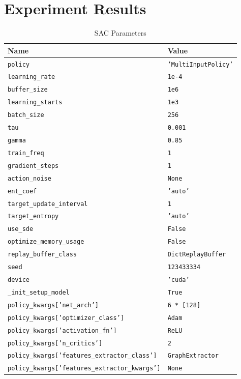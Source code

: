 \chapter{Experiment Results} \label{appendix2}


\begin{table}[H]
	\centering
	\caption{\ac{SAC} Parameters}
	\begin{tabular}{ll}
		\toprule
		\textbf{Name} & \textbf{Value} \\
		\midrule
		
		\texttt{policy} & \texttt{'MultiInputPolicy'} \\
		\texttt{learning\_rate} & \texttt{1e-4}\\
		\texttt{buffer\_size} & \texttt{1e6} \\
		\texttt{learning\_starts} & \texttt{1e3} \\
		\texttt{batch\_size} & \texttt{256} \\
		\texttt{tau} & \texttt{0.001} \\
		\texttt{gamma} & \texttt{0.85} \\
		\texttt{train\_freq} & \texttt{1} \\
		\texttt{gradient\_steps} & \texttt{1} \\
		\texttt{action\_noise} & \texttt{None} \\
		\texttt{ent\_coef} & \texttt{'auto'} \\
		\texttt{target\_update\_interval} & \texttt{1} \\
		\texttt{target\_entropy} & \texttt{'auto'} \\
		\texttt{use\_sde} & \texttt{False} \\
		\texttt{optimize\_memory\_usage} & \texttt{False} \\
		\texttt{replay\_buffer\_class} & \texttt{DictReplayBuffer} \\
		\texttt{seed} & \texttt{123433334} \\
		\texttt{device} & \texttt{'cuda'} \\
		\texttt{\_init\_setup\_model} &  \texttt{True} \\
		\texttt{policy\_kwargs['net\_arch']} & \texttt{6 * [128]} \\
		\texttt{policy\_kwargs['optimizer\_class']} & \texttt{Adam}\\
		\texttt{policy\_kwargs['activation\_fn']} & \texttt{ReLU} \\
		\texttt{policy\_kwargs['n\_critics']} & \texttt{2} \\
		\texttt{policy\_kwargs['features\_extractor\_class']} &  \texttt{GraphExtractor} \\
		\texttt{policy\_kwargs['features\_extractor\_kwargs']} & \texttt{None} \\ 
		\bottomrule
	\end{tabular}
	\label{tab:sac-params-values}
\end{table}

